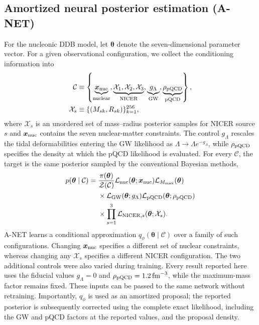 \documentclass[aps,prd,twocolumn,superscriptaddress,nofootinbib,longbibliography]{revtex4-2}
\begin{document}
\subsection{Amortized neural posterior estimation (A-NET)}
\label{sec:method:anet}
For the nucleonic DDB model, let $\bm\theta$ denote
the seven-dimensional parameter vector. For a given
observational configuration, we collect the conditioning information into
\begin{align}
\mathcal C &\equiv
 \left\{
 \underbrace{\bm x_{\rm nuc}}_{\text{nuclear}},
 \underbrace{\mathcal X_1,\mathcal X_2,\mathcal X_3}_{\text{NICER}},
 \underbrace{g_\Lambda}_{\text{GW}},
 \underbrace{\rho_{\rm pQCD}}_{\text{pQCD}}
 \right\},
 \label{eq:anet-context}\\
\mathcal X_s &\equiv \{(M_{sk},R_{sk})\}_{k=1}^{256},
\end{align}
where $\mathcal X_s$ is an unordered set of
mass--radius posterior samples for NICER source $s$ and $\bm x_{\rm nuc}$ contains the seven nuclear-matter constraints.
The control $g_\Lambda$ rescales the tidal
deformabilities entering the GW likelihood as
$\Lambda\rightarrow\Lambda e^{-g_\Lambda}$, while $\rho_{\rm pQCD}$ specifies
the density at which the pQCD likelihood is evaluated. For every $\mathcal C$,
the target is the same posterior sampled by the conventional Bayesian methods,
\begin{equation}
\begin{aligned}
p(\bm\theta\mid\mathcal C)
={}&\frac{\pi(\bm\theta)}{\mathcal Z(\mathcal C)}
 \mathcal L_{\rm nuc}(\bm\theta;\bm x_{\rm nuc})
 \mathcal L_{M_{\max}}(\bm\theta)\\
&\times \mathcal L_{\rm GW}(\bm\theta;g_\Lambda)
 \mathcal L_{\rm pQCD}(\bm\theta;\rho_{\rm pQCD})\\
&\times\prod_{s=1}^{3}
 \mathcal L_{{\rm NICER},s}(\bm\theta;\mathcal X_s).
\end{aligned}
\label{eq:anet-target}
\end{equation}
A-NET learns a conditional approximation
$q_\phi(\bm\theta\mid\mathcal C)$ over a family of such configurations.
Changing $\bm x_{\rm nuc}$ specifies a different set of nuclear constraints,
whereas changing any $\mathcal X_s$ specifies a different NICER configuration.
The two additional controls were also varied during
training. Every result reported here uses the fiducial values $g_\Lambda=0$
and $\rho_{\rm pQCD}=1.2\,{\rm fm}^{-3}$, while the maximum-mass factor remains
fixed. These inputs can be passed to the same network without retraining.
Importantly, $q_\phi$ is used as an amortized proposal; the reported posterior
is subsequently corrected using the complete exact likelihood, including the
GW and pQCD factors at the reported values, and the
proposal density.
\end{document}
